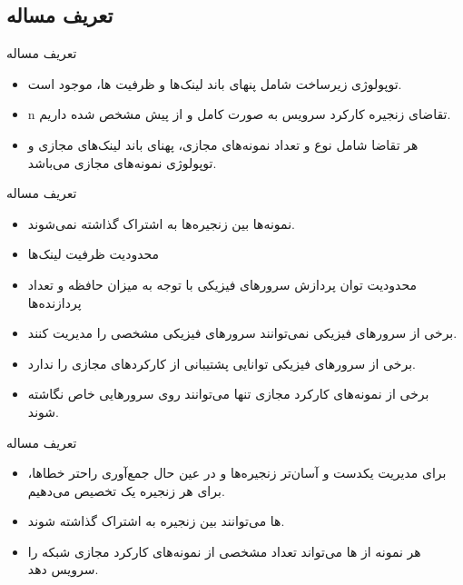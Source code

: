 \documentclass{beamer}
\makeatletter
\newcommand{\RTList}{\raggedleft\rightskip\@totalleftmargin}
\makeatother
\begin{document}
\begin{persian}
\begin{frame}{}
    \section{تعریف مساله}
\end{frame}
\begin{frame}{تعریف مساله}
    \begin{itemize}\RTList{}
        \justifying
        \item توپولوژی زیرساخت شامل پنهای باند لینک‌ها و ظرفیت ها، موجود است.
        \item n تقاضای زنجیره‌ کارکرد سرویس به صورت کامل و از پیش مشخص شده داریم.
        \item هر تقاضا شامل نوع و تعداد نمونه‌های مجازی، پهنای باند لینک‌های مجازی و توپولوژی
        نمونه‌های مجازی می‌باشد.
    \end{itemize}
\end{frame}
\begin{frame}{تعریف مساله}
    \begin{itemize}\RTList{}
        \justifying
        \item نمونه‌ها بین زنجیره‌ها به اشتراک گذاشته نمی‌شوند.
        \item محدودیت ظرفیت لینک‌ها
        \item محدودیت توان پردازش سرورهای فیزیکی با توجه به میزان حافظه و تعداد پردازنده‌ها
        \item برخی از سرور‌های فیزیکی نمی‌توانند سرور‌های فیزیکی مشخصی را مدیریت کنند.
        \item برخی از سرورهای فیزیکی توانایی پشتیبانی از کارکردهای مجازی را ندارد.
        \item برخی از نمونه‌های کارکرد مجازی تنها می‌توانند روی سرورهایی خاص نگاشته شوند.
    \end{itemize}
\end{frame}
\begin{frame}{تعریف مساله}
    \begin{itemize}\RTList{}
        \justifying
        \item برای مدیریت یکدست و آسان‌تر زنجیره‌ها و در عین حال جمع‌آوری راحتر خطاها، برای هر زنجیره یک  تخصیص می‌دهیم.
        \item {}ها می‌توانند بین زنجیره به اشتراک گذاشته شوند.
        \item هر نمونه از ها می‌تواند تعداد مشخصی از نمونه‌های کارکرد مجازی شبکه را سرویس دهد. 

\end{itemize}
\end{frame}
\end{persian}
\end{document}
